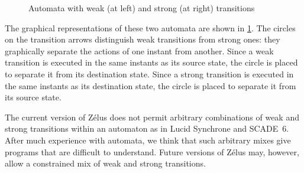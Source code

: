 \documentclass[11pt,titlepage,twoside]{report}
\makeatletter
\newcommand{\zls}[1]{{\@span{class="zelusinline"}#1}}
\newcommand{\zls}[1]{\texttt{#1}}
\renewcommand{\zls}[1]{\texttt{#1}}
\newcommand{\zelus}{{\sf Z\'elus}}
\newcommand{\lucy}{{\sf Lucid Synchrone}}
\newcommand{\scadesix}{{\sf SCADE~6}}
\newcommand{\Remark}{\medskip\noindent{\bf Remark: }}
\makeatother
\begin{document}
\begin{figure}[t]
\centering%
\caption{Automata with weak (at left) and strong (at right) 
transitions~\label{switch-figure}}
\end{figure}
The graphical representations of these two automata are shown in
\cref{switch-figure}.
The circles on the transition arrows distinguish weak transitions from 
strong ones: they graphically separate the actions of one instant from 
another.
Since a weak transition is executed in the same instants as its source 
state, the circle is placed to separate it from its destination state.
Since a strong transition is executed in the same instants as its 
destination state, the circle is placed to separate it from its source 
state.

%

\Remark The current version of \zelus{} does not permit arbitrary 
combinations of weak and strong transitions within an automaton as in 
\lucy{} and \scadesix{}.
After much experience with automata, we think that such arbitrary mixes give 
programs that are difficult to understand.
Future versions of \zelus{} may, however, allow a constrained mix of weak 
and strong transitions.
\end{document}
